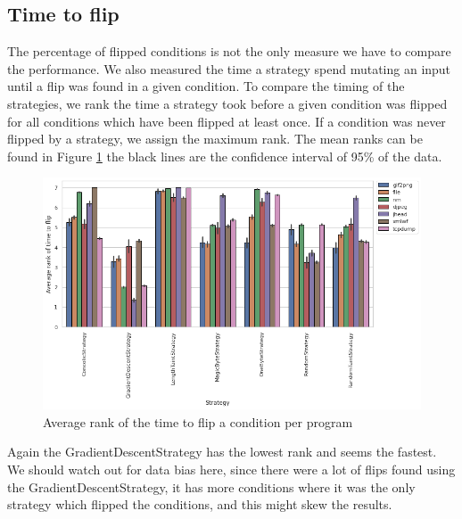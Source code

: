 \subsection{Time to flip}
The percentage of flipped conditions is not the only measure we have to compare the performance. We also measured the time a strategy spend mutating an input until a flip was found in a given condition. To compare the timing of the strategies, we rank the time a strategy took before a given condition was flipped for all conditions which have been flipped at least once. If a condition was never flipped by a strategy, we assign the maximum rank.
The mean ranks can be found in Figure \ref{fig:rank} the black lines are the confidence interval of 95\% of the data.
\begin{figure}[H]
    \centering
    \includegraphics[width=1\textwidth]{5_results/graphs_new/ranks_with_time.png}  
    \caption{Average rank of the time to flip a condition per program}
    \label{fig:rank}
\end{figure}
Again the GradientDescentStrategy has the lowest rank and seems the fastest. 
We should watch out for data bias here, since there were a lot of flips found using the GradientDescentStrategy, it has more conditions where it was the only strategy which flipped the conditions, and this might skew the results.

